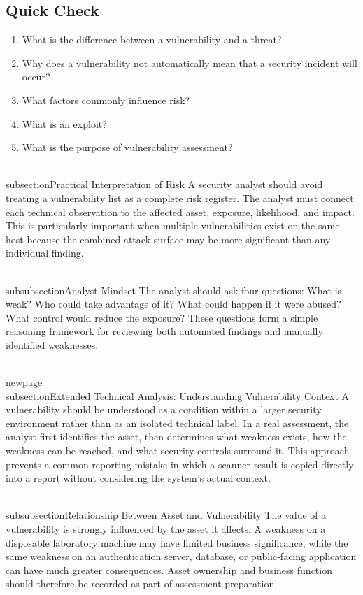 \documentclass[11pt,a4paper]{article}
\begin{document}
\subsection{Quick Check}
\begin{enumerate}
\item What is the difference between a vulnerability and a threat?
\item Why does a vulnerability not automatically mean that a security incident will occur?
\item What factors commonly influence risk?
\item What is an exploit?
\item What is the purpose of vulnerability assessment?
\end{enumerate}

\\subsection{Practical Interpretation of Risk}
A security analyst should avoid treating a vulnerability list as a complete risk register. The analyst must connect each technical observation to the affected asset, exposure, likelihood, and impact. This is particularly important when multiple vulnerabilities exist on the same host because the combined attack surface may be more significant than any individual finding.

\\subsubsection{Analyst Mindset}
The analyst should ask four questions: What is weak? Who could take advantage of it? What could happen if it were abused? What control would reduce the exposure? These questions form a simple reasoning framework for reviewing both automated findings and manually identified weaknesses.

\\newpage
\\subsection{Extended Technical Analysis: Understanding Vulnerability Context}
A vulnerability should be understood as a condition within a larger security environment rather than as an isolated technical label. In a real assessment, the analyst first identifies the asset, then determines what weakness exists, how the weakness can be reached, and what security controls surround it. This approach prevents a common reporting mistake in which a scanner result is copied directly into a report without considering the system's actual context.

\\subsubsection{Relationship Between Asset and Vulnerability}
The value of a vulnerability is strongly influenced by the asset it affects. A weakness on a disposable laboratory machine may have limited business significance, while the same weakness on an authentication server, database, or public-facing application can have much greater consequences. Asset ownership and business function should therefore be recorded as part of assessment preparation.
\end{document}
